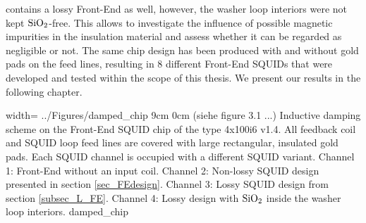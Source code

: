 contains a lossy Front-End as well, however, the washer loop interiors were not kept $\rm SiO_2$-free. This allows to investigate the influence of possible magnetic impurities in the insulation material and assess whether it can be regarded as negligible or not. The same chip design has been produced with and without gold pads on the feed lines, resulting in 8 different Front-End SQUIDs that were developed and tested within the scope of this thesis. We present our results in the following chapter.     

{width=\textwidth} %
{../Figures/damped_chip}
{9cm} %
{0cm}
{(siehe figure 3.1 ...) Inductive damping scheme on the Front-End SQUID chip of the type 4x100i6 v1.4. All feedback coil and SQUID loop feed lines are covered with large rectangular, insulated gold pads. Each SQUID channel is occupied with a different SQUID variant. Channel 1: Front-End without an input coil. Channel 2: Non-lossy SQUID design presented in section \ref{sec_FEdesign}. Channel 3: Lossy SQUID design from section \ref{subsec_L_FE}. Channel 4: Lossy design with $\rm SiO_2$ inside the washer loop interiors.}
{damped_chip}

